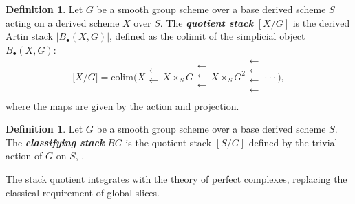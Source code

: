 \documentclass[reqno]{amsart}
\theoremstyle{definition}
\newtheorem{definition}[theorem]{Definition}
\theoremstyle{remark}
\newcommand{\bfem}[1]{\textbf{\textit{#1}}}
\begin{document}
\begin{definition}
  \label{def:derived_quotient_stack}\cite[Section 3.3]{ToenDAG}
  Let $G$ be a smooth group scheme over a base derived scheme $S$ acting on a derived scheme $X$ over $S$. The \bfem{quotient stack} $[X/G]$ is the derived Artin stack $|B_\bullet(X, G)|$,
   defined as the colimit of the simplicial object $B_\bullet(X, G)$:
    \begin{equation*}
        \big[{X}/G\big]= \mathrm{colim} \bigg(X\mathrel{\substack{\textstyle\leftarrow\\[-0.1ex]
                \textstyle\leftarrow \\[-0.1ex]}} X \times_S G
        \mathrel{\substack{\textstyle\leftarrow\\[-0.1ex]
                \textstyle\leftarrow \\[-0.1ex]
                \textstyle\leftarrow\\[-0.3ex]}} X \times_S G^2
        \mathrel{\substack{\textstyle\leftarrow\\[-0.1ex]
                \textstyle\leftarrow \\[-0.1ex]
                \textstyle\leftarrow \\[-0.1ex]
                \textstyle\leftarrow \\[-0.3ex]}} 
        \cdot\cdot\cdot \bigg),
    \end{equation*}  where the maps are given by the action and projection.
\end{definition} 
\begin{definition}
  \label{def:classifying_stack}
  Let $G$ be a smooth group scheme over a base derived scheme $S$. The \bfem{classifying stack} $BG$ is the quotient stack $[S/G]$ defined by the trivial action of $G$ on $S$, \cite[Section 3.3]{ToenDAG}.
\end{definition}

The stack quotient integrates with the theory of perfect complexes, replacing the classical requirement of global slices.
\end{document}
